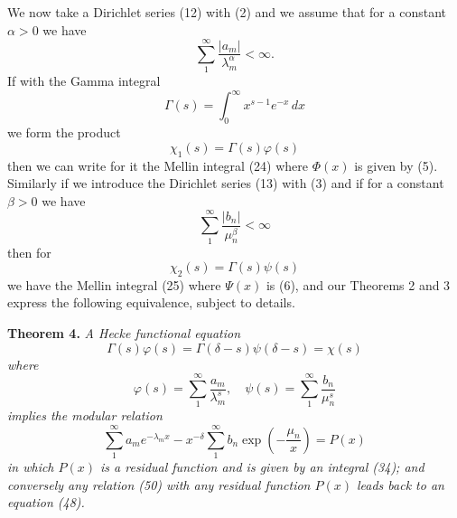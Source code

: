 \documentclass[12pt]{article}
\begin{document}
We now take a Dirichlet series (12) with (2) and we assume that for a constant \(\alpha > 0\) we have
\begin{equation}
\sum_{1}^{\infty} \frac{|a_m|}{\lambda_m^\alpha} < \infty.
\tag{44}
\end{equation}
If with the Gamma integral
\[
\Gamma(s) = \int_{0}^{\infty} x^{s-1} e^{-x} \, dx
\]
we form the product
\begin{equation}
\chi_1(s) = \Gamma(s)\varphi(s)
\tag{45}
\end{equation}
then we can write for it the Mellin integral (24) where \(\Phi(x)\) is given by (5). Similarly if we introduce the Dirichlet series (13) with (3) and if for a constant \(\beta > 0\) we have
\begin{equation}
\sum_{1}^{\infty} \frac{|b_n|}{\mu_n^\beta} < \infty
\tag{46}
\end{equation}
then for
\begin{equation}
\chi_2(s) = \Gamma(s)\psi(s)
\tag{47}
\end{equation}
we have the Mellin integral (25) where \(\Psi(x)\) is (6), and our Theorems 2 and 3 express the following equivalence, subject to details.

\medskip

\noindent\textbf{Theorem 4.} \emph{A Hecke functional equation}
\begin{equation}
\Gamma(s)\varphi(s) = \Gamma(\delta - s)\psi(\delta - s) = \chi(s)
\tag{48}
\end{equation}
\emph{where}
\begin{equation}
\varphi(s) = \sum_{1}^{\infty} \frac{a_m}{\lambda_m^s}, \quad \psi(s) = \sum_{1}^{\infty} \frac{b_n}{\mu_n^s}
\tag{49}
\end{equation}
\emph{implies the modular relation}
\begin{equation}
\sum_{1}^{\infty} a_m e^{-\lambda_m x} - x^{-\delta} \sum_{1}^{\infty} b_n \exp \left( -\frac{\mu_n}{x} \right) = P(x)
\tag{50}
\end{equation}
\emph{in which \(P(x)\) is a residual function and is given by an integral (34); and conversely any relation (50) with any residual function \(P(x)\) leads back to an equation (48).}
\end{document}
